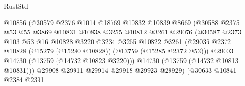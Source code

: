 \begin{lexlean}{RustStd}
\begin{coremodule}
                                        @10856
                                        (@30579
                                          @2376
                                          @1014
                                          @18769
                                          @10832
                                          @10839
                                          @8669
                                          (@30588
                                            @2375
                                            @53
                                            @55
                                            @3869
                                            @10831
                                            @10838
                                            @3255
                                            @10812
                                            @3261
                                            @29076
                                            (@30587
                                              @2373
                                              @103
                                              @53
                                              @16
                                              @10828
                                              @3220
                                              @3234
                                              @3255
                                              @10822
                                              @3261
                                              (@29036
                                                @2372
                                                @10828
                                                (@15279 (@15280 @10828))
                                                (@13759 (@15285 @2372 @53)))
                                              @29003
                                              @14730
                                              (@13759 (@14732 @10823 @3220)))
                                            @14730
                                            (@13759 (@14732 @10813 @10831)))
                                          @29908
                                          @29911
                                          @29914
                                          @29918
                                          @29923
                                          @29929)
                                        (@30633
                                          @10841
                                          @2384
                                          @2391

\end{coremodule}
\end{lexlean}
